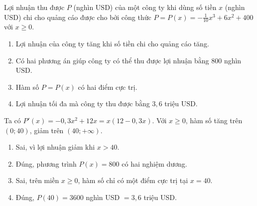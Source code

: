 \begin{baitap}
	 Lợi nhuận thu được $P$ (nghìn $\text{USD}$) của một công ty khi dùng số tiền $x$ (nghìn $\text{USD}$) chi cho quảng cáo được cho bởi công thức $P = P(x) = -\frac{1}{10}x^3 + 6x^2 + 400$ với $x \ge 0$.
	\begin{enumerate}
		\item Lợi nhuận của công ty tăng khi số tiền chi cho quảng cáo tăng.
		\item Có hai phương án giúp công ty có thể thu được lợi nhuận bằng $800$ nghìn $\text{USD}$.
		\item Hàm số $P = P(x)$ có hai điểm cực trị.
		\item Lợi nhuận tối đa mà công ty thu được bằng $3{,}6$ triệu $\text{USD}$.
	\end{enumerate}
	\begin{traloi}
		Ta có \(P'(x)=-0{,}3x^2+12x=x(12-0{,}3x)\). Với \(x\ge0\), hàm số tăng trên \((0;40)\), giảm trên \((40;+\infty)\).
		\begin{enumerate}
			\item Sai, vì lợi nhuận giảm khi \(x>40\).
			\item Đúng, phương trình \(P(x)=800\) có hai nghiệm dương.
			\item Sai, trên miền \(x\ge0\), hàm số chỉ có một điểm cực trị tại \(x=40\).
			\item Đúng, \(P(40)=3600\) nghìn USD \(=3{,}6\) triệu USD.
		\end{enumerate}
	\end{traloi}
\end{baitap}


